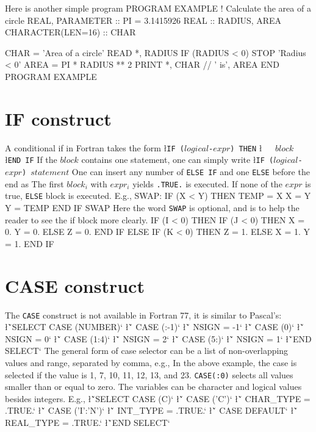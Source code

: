 {Here is another simple program
\ttbg
PROGRAM EXAMPLE
! Calculate the area of a circle
REAL, PARAMETER :: PI = 3.1415926
REAL :: RADIUS, AREA
CHARACTER(LEN=16) :: CHAR

CHAR = 'Area of a circle'
READ *, RADIUS
IF (RADIUS < 0) STOP 'Radius < 0'
AREA = PI * RADIUS ** 2
PRINT *, CHAR // ' is', AREA
END PROGRAM EXAMPLE
\tted


\vfill\eject
{}

\section{IF construct}
A conditional if in Fortran takes the form
\sms
\l{\t\tt IF ($logical$-$expr$) THEN}
\l{\t\tt\ \ \ $block$}
\l{\t\tt END IF}
\sms
If the $block$ contains one statement, one can simply write
\sms
\l{\t\tt IF ($logical$-$expr$) $statement$}
\sms
One can insert any number of {\tt ELSE IF} and one {\tt ELSE} before
the end as
\sms
{}
\sms
The first $block_i$ with $expr_i$ yields {\tt .TRUE.} is executed.  If none
of the $expr$ is true, {\tt ELSE} block is executed. E.g.,
\ttbg
SWAP: IF (X < Y) THEN
         TEMP = X
         X = Y
         Y = TEMP
      END IF SWAP
\tted
Here the word {\tt SWAP} is optional, and is to help the reader to 
see the if block more clearly.  
\ttbg
IF (I < 0) THEN
   IF (J < 0) THEN
      X = 0.
      Y = 0.
   ELSE
      Z = 0.
   END IF
ELSE IF (K < 0) THEN
   Z = 1.
ELSE
   X = 1.
   Y = 1.
END IF
\tted

\section{CASE construct}
The {\tt CASE} construct is not available in Fortran 77, it is
similar to Pascal's:
\sms
\l{\v`SELECT CASE (NUMBER)`}
\l{\v`   CASE (:-1)`}
\l{\v`      NSIGN = -1`\m{}}
\l{\v`   CASE (0)`}
\l{\v`      NSIGN = 0`\m{}}
\l{\v`   CASE (1:4)`}
\l{\v`      NSIGN = 2`\m{}}
\l{\v`   CASE (5:)`}
\l{\v`      NSIGN = 1`\m{}}
\l{\v`END SELECT`\m{}}
\sms
The general form of case selector can be a list of non-overlapping
values and range, separated by comma, e.g., 
\sms
{}
\sms
In the above example, 
the case is selected if the value is 1, 7, 10, 11, 12, 13, and 23. 
{\tt CASE(:0)} selects all values smaller than or equal to zero.
The variables can be character and logical values besides
integers.  E.g.,
\sms
\l{\v`SELECT CASE (C)`}
\l{\v`   CASE ('C')`\m{}}
\l{\v`      CHAR_TYPE = .TRUE.`\m{}}
\l{\v`   CASE ('I':'N')`\m{}}
\l{\v`      INT_TYPE = .TRUE.`\m{}}
\l{\v`   CASE DEFAULT`}
\l{\v`      REAL_TYPE = .TRUE.`\m{}}
\l{\v`END SELECT`\m{}}
\sms

}
